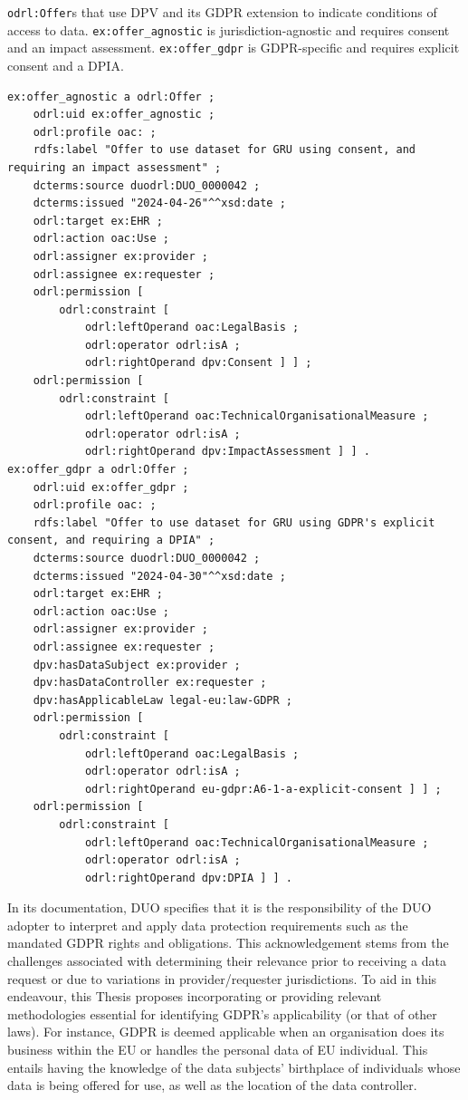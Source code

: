 \begin{listing}[htp]
\caption{\texttt{odrl:Offer}s that use DPV and its GDPR extension to indicate conditions of access to data. \texttt{ex:offer\_agnostic} is jurisdiction-agnostic and requires consent and an impact assessment. \texttt{ex:offer\_gdpr} is GDPR-specific and requires explicit consent and a DPIA.}
\label{list:duodrol_dpv}
\begin{verbatim}
ex:offer_agnostic a odrl:Offer ;
    odrl:uid ex:offer_agnostic ;
    odrl:profile oac: ;
    rdfs:label "Offer to use dataset for GRU using consent, and requiring an impact assessment" ;
    dcterms:source duodrl:DUO_0000042 ;
    dcterms:issued "2024-04-26"^^xsd:date ;
    odrl:target ex:EHR ;
    odrl:action oac:Use ;
    odrl:assigner ex:provider ;
    odrl:assignee ex:requester ;
    odrl:permission [
        odrl:constraint [ 
            odrl:leftOperand oac:LegalBasis ;
            odrl:operator odrl:isA ;
            odrl:rightOperand dpv:Consent ] ] ;
    odrl:permission [
        odrl:constraint [ 
            odrl:leftOperand oac:TechnicalOrganisationalMeasure ;
            odrl:operator odrl:isA ;
            odrl:rightOperand dpv:ImpactAssessment ] ] .
ex:offer_gdpr a odrl:Offer ;
    odrl:uid ex:offer_gdpr ;
    odrl:profile oac: ;
    rdfs:label "Offer to use dataset for GRU using GDPR's explicit consent, and requiring a DPIA" ;
    dcterms:source duodrl:DUO_0000042 ;
    dcterms:issued "2024-04-30"^^xsd:date ;
    odrl:target ex:EHR ;
    odrl:action oac:Use ;
    odrl:assigner ex:provider ;
    odrl:assignee ex:requester ;
    dpv:hasDataSubject ex:provider ;
    dpv:hasDataController ex:requester ;
    dpv:hasApplicableLaw legal-eu:law-GDPR ;
    odrl:permission [
        odrl:constraint [
            odrl:leftOperand oac:LegalBasis ;
            odrl:operator odrl:isA ;
            odrl:rightOperand eu-gdpr:A6-1-a-explicit-consent ] ] ;
    odrl:permission [
        odrl:constraint [ 
            odrl:leftOperand oac:TechnicalOrganisationalMeasure ;
            odrl:operator odrl:isA ;
            odrl:rightOperand dpv:DPIA ] ] .
\end{verbatim}
\end{listing}

In its documentation, DUO specifies that it is the responsibility of the DUO adopter to interpret and apply data protection requirements such as the mandated GDPR rights and obligations.
This acknowledgement stems from the challenges associated with determining their relevance prior to receiving a data request or due to variations in provider/requester jurisdictions.
To aid in this endeavour, this Thesis proposes incorporating or providing relevant methodologies essential for identifying GDPR's applicability (or that of other laws).
For instance, GDPR is deemed applicable when an organisation does its business within the EU or handles the personal data of EU individual. 
This entails having the knowledge of the data subjects' birthplace of individuals whose data is being offered for use, as well as the location of the data controller.

